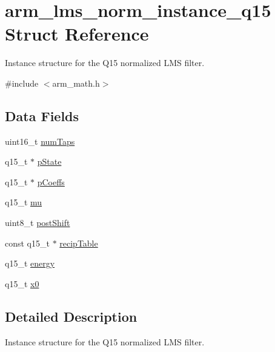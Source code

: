 \hypertarget{structarm__lms__norm__instance__q15}{}\section{arm\+\_\+lms\+\_\+norm\+\_\+instance\+\_\+q15 Struct Reference}
\label{structarm__lms__norm__instance__q15}


Instance structure for the Q15 normalized L\+MS filter.  




{\ttfamily \#include $<$arm\+\_\+math.\+h$>$}

\subsection*{Data Fields}
\begin{DoxyCompactItemize}
\item 
uint16\+\_\+t \mbox{\hyperlink{structarm__lms__norm__instance__q15_a751941891e47f522a7f5375fe8990aac}{num\+Taps}}
\item 
q15\+\_\+t $\ast$ \mbox{\hyperlink{structarm__lms__norm__instance__q15_ae29dfdb736374fcddaeaec4b7770170c}{p\+State}}
\item 
q15\+\_\+t $\ast$ \mbox{\hyperlink{structarm__lms__norm__instance__q15_a7ca181a37f714d174445f486bebce26f}{p\+Coeffs}}
\item 
q15\+\_\+t \mbox{\hyperlink{structarm__lms__norm__instance__q15_aab4745770bd667de040227eec1b5ff8d}{mu}}
\item 
uint8\+\_\+t \mbox{\hyperlink{structarm__lms__norm__instance__q15_a74050e9f36542bd56f4052381a82ae8f}{post\+Shift}}
\item 
const q15\+\_\+t $\ast$ \mbox{\hyperlink{structarm__lms__norm__instance__q15_adb208045a3bf521f9522f574dc76dff3}{recip\+Table}}
\item 
q15\+\_\+t \mbox{\hyperlink{structarm__lms__norm__instance__q15_ae7a8ccabc82348f6742ca7a2b3da2a41}{energy}}
\item 
q15\+\_\+t \mbox{\hyperlink{structarm__lms__norm__instance__q15_a3c975fed200b19723a2ed11efccca6cd}{x0}}
\end{DoxyCompactItemize}


\subsection{Detailed Description}
Instance structure for the Q15 normalized L\+MS filter. 

